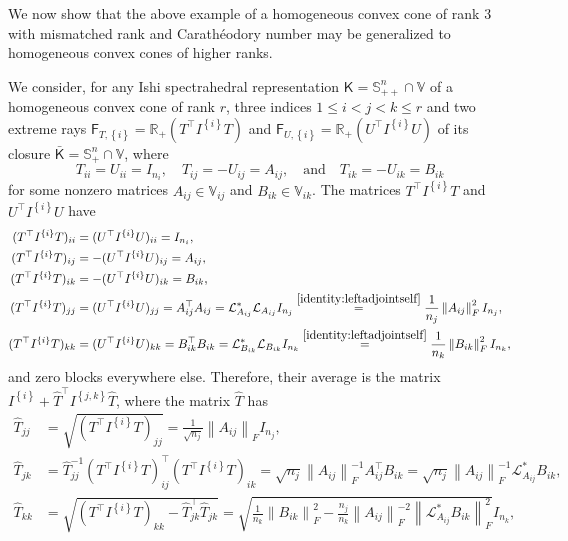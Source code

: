 \documentclass[oneside]{amsart}
\theoremstyle{plain}
\theoremstyle{definition}
\theoremstyle{remark}
\numberwithin{equation}{section}
\begin{document}
We now show that the above example of a homogeneous convex cone of rank $3$
with mismatched rank and Carath\'eodory number may be generalized to
homogeneous convex cones of higher ranks.

We consider, for any Ishi spectrahedral representation $\mathsf{K} =
\mathbb{S}^{n}_{++} \cap \mathbb{V}$ of a homogeneous convex cone of rank
$r$, three indices $1 \leq i < j < k \leq r$ and two extreme rays
$\mathsf{F}_{T,\left\{i\right\}} = \mathbb{R}_+ (T^{\top}
I^{\left\{i\right\}} T)$ and $\mathsf{F}_{U,\left\{i\right\}} =
\mathbb{R}_+ (U^{\top} I^{\left\{i\right\}} U)$ of its closure
$\bar{\mathsf{K}} = \mathbb{S}^{n}_{+} \cap \mathbb{V}$, where
\[
T_{ii} = U_{ii} = I_{n_{i}}, \quad T_{ij} = -U_{ij} = A_{ij}, \quad
\text{and} \quad T_{ik} = -U_{ik} = B_{ik}
\]
for some nonzero matrices $A_{ij} \in \mathbb{V}_{ij}$ and $B_{ik} \in
\mathbb{V}_{ik}$. The matrices $T^{\top} I^{\left\{i\right\}} T$ and
$U^{\top} I^{\left\{i\right\}} U$ have
\[
\begin{aligned}
(T^{\top} I^{\left\{i\right\}} T)_{ii} &= (U^{\top} I^{\left\{i\right\}}
U)_{ii} = I_{n_{i}}, \quad
\\
(T^{\top} I^{\left\{i\right\}} T)_{ij} &= -(U^{\top} I^{\left\{i\right\}}
U)_{ij} = A_{ij}, \quad
\\
(T^{\top} I^{\left\{i\right\}} T)_{ik} &= -(U^{\top} I^{\left\{i\right\}}
U)_{ik} = B_{ik},
\\
(T^{\top} I^{\left\{i\right\}} T)_{jj} &= (U^{\top} I^{\left\{i\right\}}
U)_{jj} = A_{ij}^{\top} A_{ij} = \mathcal{L}^{*}_{A_{ij}}
\mathcal{L}_{A_{ij}} I_{n_{j}} \overset{\ref{identity:leftadjointself}}{=}
\frac{1}{n_{j}} \left\lVert A_{ij}\right\rVert_{F}^{2} I_{n_{j}},
\\
(T^{\top} I^{\left\{i\right\}} T)_{kk} &= (U^{\top} I^{\left\{i\right\}}
U)_{kk} = B_{ik}^{\top} B_{ik} = \mathcal{L}^{*}_{B_{ik}}
\mathcal{L}_{B_{ik}} I_{n_{k}} \overset{\ref{identity:leftadjointself}}{=}
\frac{1}{n_{k}} \left\lVert B_{ik}\right\rVert_{F}^{2} I_{n_{k}},
\end{aligned}
\]
and zero blocks everywhere else. Therefore, their average is the matrix
$I^{\left\{i\right\}} + \hat{T}^{\top} I^{\left\{j,k\right\}} \hat{T}$,
where the matrix $\hat{T}$ has
\[
\begin{aligned}
\hat{T}_{jj} &= \sqrt{(T^{\top} I^{\left\{i\right\}} T)_{jj}} =
\frac{1}{\sqrt{n_{j}}} \left\lVert A_{ij}\right\rVert_{F} I_{n_{j}},
\\
\hat{T}_{jk} &= \hat{T}_{jj}^{-1} (T^{\top} I^{\left\{i\right\}}
T)_{ij}^{\top} (T^{\top} I^{\left\{i\right\}} T)_{ik} = \sqrt{n_{j}}
\left\lVert A_{ij}\right\rVert_{F}^{-1} A_{ij}^{\top} B_{ik} = \sqrt{n_{j}}
\left\lVert A_{ij}\right\rVert_{F}^{-1} \mathcal{L}^{*}_{A_{ij}} B_{ik},
\\
\hat{T}_{kk} &= \sqrt{(T^{\top} I^{\left\{i\right\}} T)_{kk} -
\hat{T}_{jk}^{\top} \hat{T}_{jk}} = \sqrt{\frac{1}{n_{k}} \left\lVert
B_{ik}\right\rVert_{F}^{2} - \frac{n_{j}}{n_{k}} \left\lVert
A_{ij}\right\rVert_{F}^{-2} \left\lVert \mathcal{L}^{*}_{A_{ij}}
B_{ik}\right\rVert_{F}^{2}} I_{n_{k}},
\end{aligned}
\]
\end{document}
